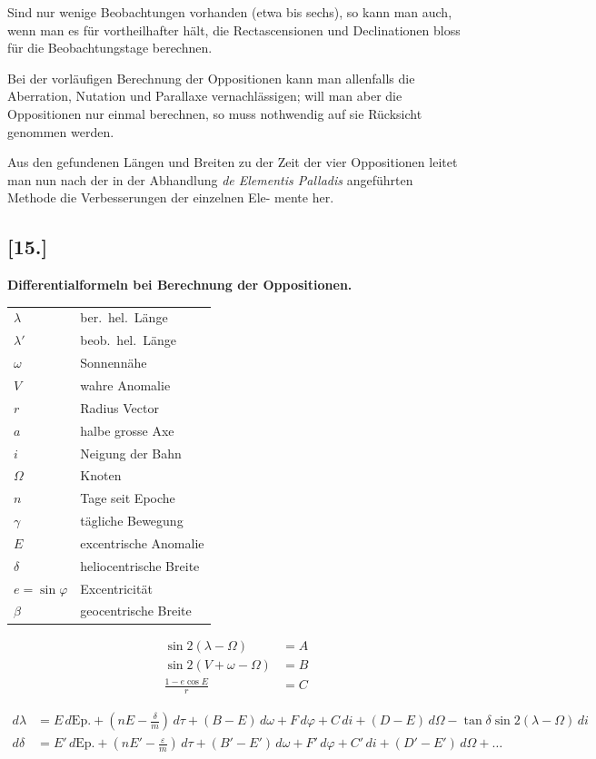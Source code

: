 \documentclass[12pt,a4paper]{article}
\begin{document}
Sind nur wenige Beobachtungen vorhanden (etwa bis sechs), so kann man auch, wenn man es f\"ur
vortheilhafter h\"alt, die Rectascensionen und Declinationen bloss f\"ur die Beobachtungstage berechnen.

Bei der vorl\"aufigen Berechnung der Oppositionen kann man allenfalls die Aberration, Nutation und
Parallaxe vernachl\"assigen; will man aber die Oppositionen nur einmal berechnen, so muss nothwendig auf
sie R\"ucksicht genommen werden.

Aus den gefundenen L\"angen und Breiten zu der Zeit der vier Oppositionen leitet man nun nach der
in der Abhandlung \textit{de Elementis Palladis} angef\"uhrten Methode die Verbesserungen der einzelnen Ele-
mente her.

\subsection*{[15.]}
\textbf{Differentialformeln bei Berechnung der Oppositionen.}

\begin{center}
\begin{tabular}{ll}
$\lambda$ & ber.~hel.~L\"ange \\
$\lambda'$ & beob.~hel.~L\"ange \\
$\omega$ & Sonnenn\"ahe \\
$V$ & wahre Anomalie \\
$r$ & Radius Vector \\
$a$ & halbe grosse Axe \\
$i$ & Neigung der Bahn \\
$\Omega$ & Knoten \\
$n$ & Tage seit Epoche \\
$\gamma$ & t\"agliche Bewegung \\
$E$ & excentrische Anomalie \\
$\delta$ & heliocentrische Breite \\
$e = \sin\varphi$ & Excentricit\"at \\
$\beta$ & geocentrische Breite
\end{tabular}
\end{center}

\begin{align*}
\sin 2(\lambda - \Omega) &= A \\
\sin 2(V + \omega - \Omega) &= B \\
\frac{1 - e\cos E}{r} &= C
\end{align*}

\begin{align*}
d\lambda &= E\,d\text{Ep.} + (nE - \tfrac{\delta}{m})\,d\tau + (B - E)\,d\omega + F\,d\varphi + C\,di + (D - E)\,d\Omega - \tan\delta \sin 2(\lambda - \Omega)\,di \\
d\delta &= E'\,d\text{Ep.} + (nE' - \tfrac{\varepsilon}{m})\,d\tau + (B' - E')\,d\omega + F'\,d\varphi + C'\,di + (D' - E')\,d\Omega + \ldots
\end{align*}
\end{document}
